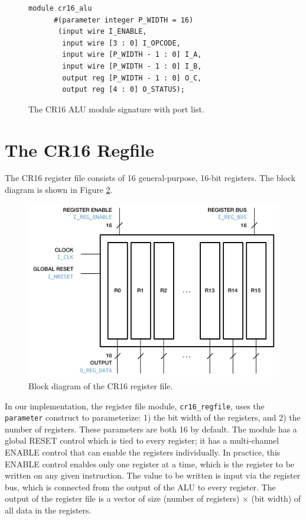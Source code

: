\documentclass[conference]{IEEEtran}
\begin{document}
\begin{figure}
    \begin{lstlisting}[style={verilog-style}]
module cr16_alu
      #(parameter integer P_WIDTH = 16)
       (input wire I_ENABLE,
        input wire [3 : 0] I_OPCODE,
        input wire [P_WIDTH - 1 : 0] I_A,
        input wire [P_WIDTH - 1 : 0] I_B,
        output reg [P_WIDTH - 1 : 0] O_C,
        output reg [4 : 0] O_STATUS);
    \end{lstlisting}
    \caption{The CR16 ALU module signature with port list.}
    \label{figure_cr16_alu_module_signature}
\end{figure}

\section{The CR16 Regfile}

The CR16 register file consists of 16 general-purpose, 16-bit registers. The block diagram is shown in Figure \ref{fig:regfile_block_diagram}.

\begin{figure}[htbp]
    \centering
    \includegraphics[scale=1.0]{lab_2_figures/regfile_block_diagram.pdf}
    \caption{Block diagram of the CR16 register file.}
    \label{fig:regfile_block_diagram}
\end{figure}

In our implementation, the register file module, \verb|cr16_regfile|, uses the \verb|parameter| construct to parameterize: 1) the bit width of the registers, and 2) the number of registers. These parameters are both 16 by default. The module has a global RESET control which is tied to every register; it has a multi-channel ENABLE control that can enable the registers individually. In practice, this ENABLE control enables only one register at a time, which is the register to be written on any given instruction. The value to be written is input via the register bus, which is connected from the output of the ALU to every register. The output of the register file is a vector of size (number of registers) × (bit width) of all data in the registers.
\end{document}
